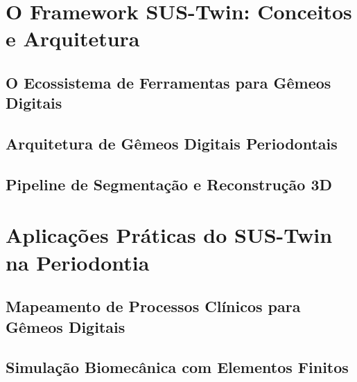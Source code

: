\documentclass[12pt,a4paper,oneside,openright]{abntex2}
\begin{document}










\listoffigures*
\cleardoublepage

\listoftables*
\cleardoublepage

\begingroup
\footnotesize
\lstlistoflistings
\endgroup
\cleardoublepage

\tableofcontents*
\cleardoublepage

\textual

\part{O Framework SUS-Twin: Conceitos e Arquitetura}
\chapter{O Ecossistema de Ferramentas para Gêmeos Digitais} \label{ch:introducao}

\chapter{Arquitetura de Gêmeos Digitais Periodontais} \label{ch:fundamentos}

\chapter{Pipeline de Segmentação e Reconstrução 3D} \label{ch:medicina}


\part{Aplicações Práticas do SUS-Twin na Periodontia}
\chapter{Mapeamento de Processos Clínicos para Gêmeos Digitais} \label{ch:panorama}

\chapter{Simulação Biomecânica com Elementos Finitos}

\end{document}
